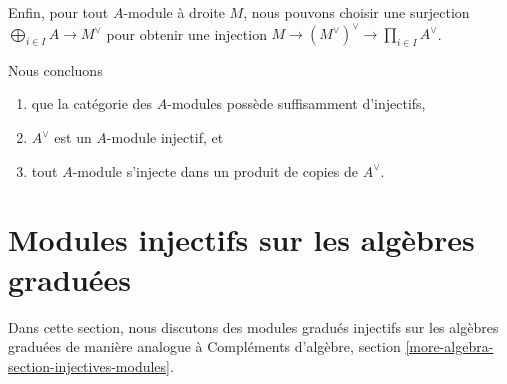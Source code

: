 \medskip\noindent
Enfin, pour tout $A$-module à droite $M$, nous pouvons choisir une
surjection $\bigoplus_{i \in I} A \to M^\vee$ pour obtenir une
injection $M \to (M^\vee)^\vee \to \prod_{i \in I} A^\vee$.

\medskip\noindent
Nous concluons
\begin{enumerate}
\item que la catégorie des $A$-modules possède suffisamment d'injectifs,
\item $A^\vee$ est un $A$-module injectif, et
\item tout $A$-module s'injecte dans un produit de copies de $A^\vee$.
\end{enumerate}





\section{Modules injectifs sur les algèbres graduées}
\label{section-modules-noncommutative-graded}

\noindent
Dans cette section, nous discutons des modules gradués injectifs sur les algèbres
graduées de manière
analogue à Compléments d'algèbre, section \ref{more-algebra-section-injectives-modules}.

